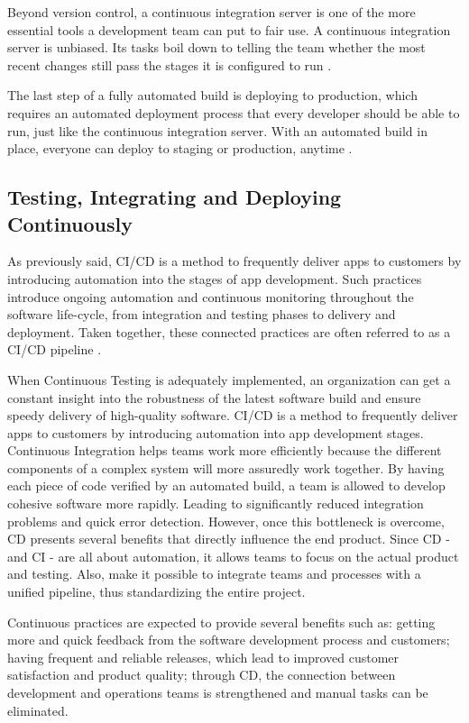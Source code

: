 Beyond version control, a continuous integration server is one of the more
essential tools a development team can put to fair use. A continuous integration
server is unbiased. Its tasks boil down to telling the team whether the most
recent changes still pass the stages it is configured to run \cite{meyer2014}.

The last step of a fully automated build is deploying to production, which
requires an automated deployment process that every developer should be able to
run, just like the continuous integration server. With an automated build in
place, everyone can deploy to staging or production, anytime \cite{meyer2014}.

\subsection{Testing, Integrating and Deploying Continuously}

As previously said, CI/CD is a method to frequently deliver apps to customers by
introducing automation into the stages of app development. Such practices
introduce ongoing automation and continuous monitoring throughout the software
life-cycle, from integration and testing phases to delivery and deployment.
Taken together, these connected practices are often referred to as a CI/CD
pipeline \cite{redhat}.

When Continuous Testing is adequately implemented, an organization can get a
constant insight into the robustness of the latest software build and ensure
speedy delivery of high-quality software. CI/CD is a method to frequently
deliver apps to customers by introducing automation into app development stages.
Continuous Integration helps teams work more efficiently because the different
components of a complex system will more assuredly work together. By having each
piece of code verified by an automated build, a team is allowed to develop
cohesive software more rapidly. Leading to significantly reduced integration
problems and quick error detection. However, once this bottleneck is overcome,
CD presents several benefits that directly influence the end product. Since CD -
and CI - are all about automation, it allows teams to focus on the actual
product and testing. Also, make it possible to integrate teams and processes
with a unified pipeline, thus standardizing the entire project.

Continuous practices are expected to provide several benefits such as: getting
more and quick feedback from the software development process and customers;
having frequent and reliable releases, which lead to improved customer
satisfaction and product quality; through CD, the connection between development
and operations teams is strengthened and manual tasks can be eliminated.

